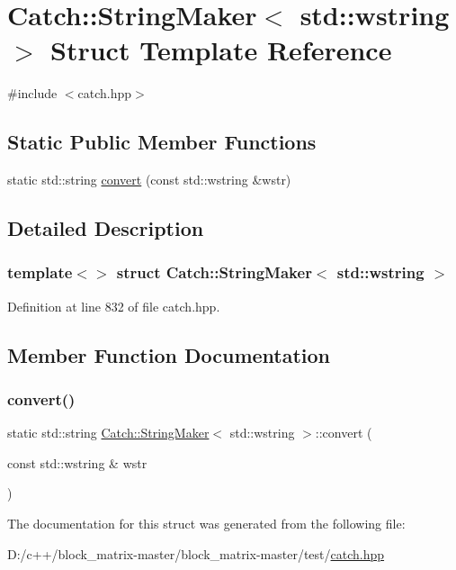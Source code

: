 \hypertarget{struct_catch_1_1_string_maker_3_01std_1_1wstring_01_4}{}\section{Catch\+:\+:String\+Maker$<$ std\+:\+:wstring $>$ Struct Template Reference}
\label{struct_catch_1_1_string_maker_3_01std_1_1wstring_01_4}


{\ttfamily \#include $<$catch.\+hpp$>$}

\subsection*{Static Public Member Functions}
\begin{DoxyCompactItemize}
\item 
static std\+::string \mbox{\hyperlink{struct_catch_1_1_string_maker_3_01std_1_1wstring_01_4_a375d49d6281bee4d36d853fa1bd5ebbd}{convert}} (const std\+::wstring \&wstr)
\end{DoxyCompactItemize}


\subsection{Detailed Description}
\subsubsection*{template$<$$>$\newline
struct Catch\+::\+String\+Maker$<$ std\+::wstring $>$}



Definition at line 832 of file catch.\+hpp.



\subsection{Member Function Documentation}
\mbox{\label{struct_catch_1_1_string_maker_3_01std_1_1wstring_01_4_a375d49d6281bee4d36d853fa1bd5ebbd}} 
\subsubsection{\texorpdfstring{convert()}{convert()}}
{\footnotesize\ttfamily static std\+::string \mbox{\hyperlink{struct_catch_1_1_string_maker}{Catch\+::\+String\+Maker}}$<$ std\+::wstring $>$\+::convert (\begin{DoxyParamCaption}\item[{const std\+::wstring \&}]{wstr }\end{DoxyParamCaption})\hspace{0.3cm}{\ttfamily [static]}}



The documentation for this struct was generated from the following file\+:\begin{DoxyCompactItemize}
\item 
D\+:/c++/block\+\_\+matrix-\/master/block\+\_\+matrix-\/master/test/\mbox{\hyperlink{catch_8hpp}{catch.\+hpp}}\end{DoxyCompactItemize}
